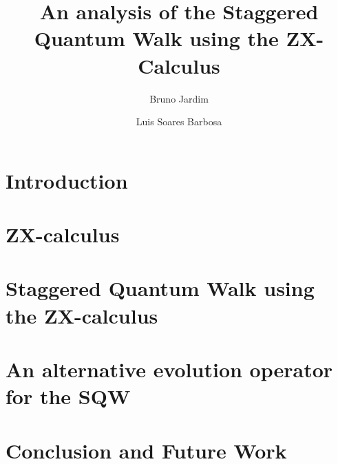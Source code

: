 \documentclass[a4paper,onecolumn,11pt,unpublished]{quantumarticle}
\begin{document}
\title{An analysis of the Staggered Quantum Walk using the ZX-Calculus}
\author{Bruno Jardim}
\author{Luis Soares Barbosa}

\maketitle

\begin{abstract}
    
\end{abstract}

\section{Introduction}
\label{sec:introduction}


\section{ZX-calculus}
\label{sec:zx-calculus}


\section{Staggered Quantum Walk using the ZX-calculus}
\label{sec:sqw}


\section{An alternative evolution operator for the SQW}
\label{sec:ev-op}


\section{Conclusion and Future Work}
\label{sec:conclusion}



\printbibliography
\end{document}
